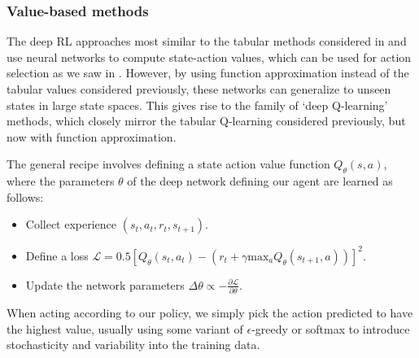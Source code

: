 
\subsubsection*{Value-based methods}

The deep RL approaches most similar to the tabular methods considered in  and  use neural networks to compute state-action values, which can be used for action selection as we saw in .
However, by using function approximation instead of the tabular values considered previously, these networks can generalize to unseen states in large state spaces.
This gives rise to the family of `deep Q-learning' methods, which closely mirror the tabular Q-learning considered previously, but now with function approximation.

The general recipe involves defining a state action value function $Q_\theta(s, a)$, where the parameters $\theta$ of the deep network defining our agent are learned as follows:
\begin{itemize}
    \item Collect experience $(s_t, a_t, r_t, s_{t+1})$.
    \item Define a loss $\mathcal{L} = 0.5 [ Q_\theta(s_t, a_t) - (r_t + \gamma \text{max}_a Q_\theta(s_{t+1}, a)) ]^2 $.
    \item Update the network parameters $\Delta \theta \propto - \frac{\partial \mathcal{L}}{\partial \theta}$.
\end{itemize}
When acting according to our policy, we simply pick the action predicted to have the highest value, usually using some variant of $\epsilon$-greedy or softmax to introduce stochasticity and variability into the training data.

